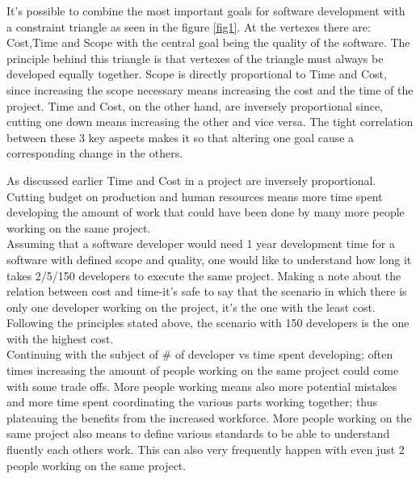 \begin{parlist}
	\item It's possible to combine the most important goals for software development with a constraint triangle as seen in the figure \ref{fig1}\cite{asana_2022}. At the vertexes there are: Cost,Time and Scope with the central goal being the quality of the software. The principle behind this triangle is that vertexes of the triangle must always be developed equally together. Scope is directly proportional to Time and Cost, since increasing the scope necessary means increasing the cost and the time of the project. Time and Cost, on the other hand, are inversely proportional since, cutting one down means increasing the other and vice versa. The tight correlation between these 3 key aspects makes it so that altering one goal cause a corresponding change in the others.
	\item As discussed earlier Time and Cost in a project are inversely proportional. Cutting budget on production and human resources means more time spent developing the amount of work that could have been done by many more people working on the same project. \\ Assuming that a software developer would need 1 year development time for a software with defined scope and quality, one would like to understand how long it takes 2/5/150 developers to execute the same project. Making a note about the relation between cost and time-it's safe to say that the scenario in which there is only one developer working on the project, it's the one with the least cost. Following the principles stated above, the scenario with 150 developers is the one with the highest cost.\\ Continuing with the subject of \# of developer vs time spent developing; often times increasing the amount of people working on the same project could come with some trade offs. More people working means also more potential mistakes and more time spent coordinating the various parts working together; thus plateauing the benefits from the increased workforce. More people working on the same project also means to define various standards to be able to understand fluently each others work. This can also very frequently happen with even just 2 people working on the same project. \cite{alma990004140290402883}
\end{parlist}
	